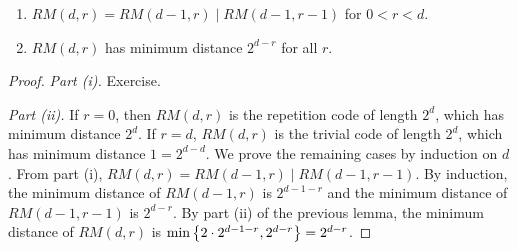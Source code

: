 \begin{theorem}
    \begin{enumerate}
        \item \( RM(d,r) = RM(d-1,r) \mid RM(d-1,r-1) \) for \( 0 < r < d \).
        \item \( RM(d,r) \) has minimum distance \( 2^{d-r} \) for all \( r \).
    \end{enumerate}
\end{theorem}
\begin{proof}
    \emph{Part (i).}
    Exercise.

    \emph{Part (ii).}
    If \( r = 0 \), then \( RM(d,r) \) is the repetition code of length \( 2^d \), which has minimum distance \( 2^d \).
    If \( r = d \), \( RM(d,r) \) is the trivial code of length \( 2^d \), which has minimum distance \( 1 = 2^{d-d} \).
    We prove the remaining cases by induction on \( d \).
    From part (i), \( RM(d,r) = RM(d-1,r) \mid RM(d-1,r-1) \).
    By induction, the minimum distance of \( RM(d-1,r) \) is \( 2^{d-1-r} \) and the minimum distance of \( RM(d-1,r-1) \) is \( 2^{d-r} \).
    By part (ii) of the previous lemma, the minimum distance of \( RM(d,r) \) is \( \min\qty{2\cdot 2^{d-1-r}, 2^{d-r}} = 2^{d-r} \).
\end{proof}

